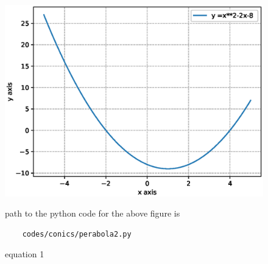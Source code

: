 \begin{enumerate}[label=\arabic*.,ref=\thesubsection.\theenumi]
\begin{figure}[!ht]
	\centering
	\includegraphics[width=\columnwidth]{./figures/conics/perabola1.eps}
	\caption{equation 1 }
	\label{fig:perabola1}
	path to the python code for the above figure is 
	\begin{lstlisting}
	codes/conics/perabola2.py
	\end{lstlisting}
\end{figure}




\end{enumerate}
